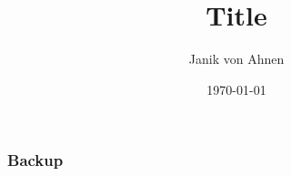 \documentclass{beamer}
\title[short title]{Title}
\author[Janik von Ahnen (DESY)]{Janik von Ahnen}
\institute[]{}
\date[\today]{\today}
\begin{document}
\frame{\titlepage}

\appendix
\begin{frame}
    \frametitle{Backup}
\end{frame}
\end{document}
